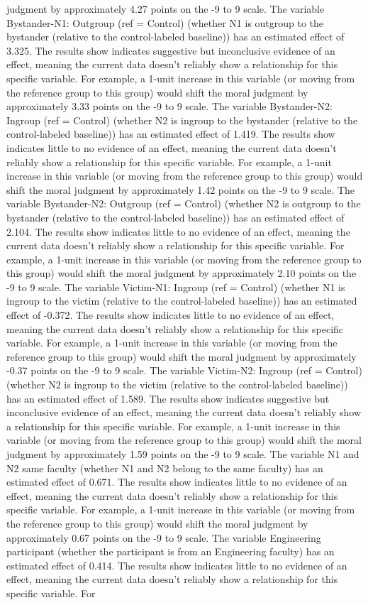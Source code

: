 \documentclass[11pt]{article}
\begin{document}
judgment by approximately 4.27 points on the -9 to 9 scale. The variable Bystander-N1: Outgroup (ref = Control) (whether N1 is outgroup to the bystander (relative to the control-labeled baseline)) has an estimated effect of 3.325. The results show indicates suggestive but inconclusive evidence of an effect, meaning the current data doesn't reliably show a relationship for this specific variable. For example, a 1-unit increase in this variable (or moving from the reference group to this group) would shift the moral judgment by approximately 3.33 points on the -9 to 9 scale. The variable Bystander-N2: Ingroup (ref = Control) (whether N2 is ingroup to the bystander (relative to the control-labeled baseline)) has an estimated effect of 1.419. The results show indicates little to no evidence of an effect, meaning the current data doesn't reliably show a relationship for this specific variable. For example, a 1-unit increase in this variable (or moving from the reference group to this group) would shift the moral judgment by approximately 1.42 points on the -9 to 9 scale. The variable Bystander-N2: Outgroup (ref = Control) (whether N2 is outgroup to the bystander (relative to the control-labeled baseline)) has an estimated effect of 2.104. The results show indicates little to no evidence of an effect, meaning the current data doesn't reliably show a relationship for this specific variable. For example, a 1-unit increase in this variable (or moving from the reference group to this group) would shift the moral judgment by approximately 2.10 points on the -9 to 9 scale. The variable Victim-N1: Ingroup (ref = Control) (whether N1 is ingroup to the victim (relative to the control-labeled baseline)) has an estimated effect of -0.372. The results show indicates little to no evidence of an effect, meaning the current data doesn't reliably show a relationship for this specific variable. For example, a 1-unit increase in this variable (or moving from the reference group to this group) would shift the moral judgment by approximately -0.37 points on the -9 to 9 scale. The variable Victim-N2: Ingroup (ref = Control) (whether N2 is ingroup to the victim (relative to the control-labeled baseline)) has an estimated effect of 1.589. The results show indicates suggestive but inconclusive evidence of an effect, meaning the current data doesn't reliably show a relationship for this specific variable. For example, a 1-unit increase in this variable (or moving from the reference group to this group) would shift the moral judgment by approximately 1.59 points on the -9 to 9 scale. The variable N1 and N2 same faculty (whether N1 and N2 belong to the same faculty) has an estimated effect of 0.671. The results show indicates little to no evidence of an effect, meaning the current data doesn't reliably show a relationship for this specific variable. For example, a 1-unit increase in this variable (or moving from the reference group to this group) would shift the moral judgment by approximately 0.67 points on the -9 to 9 scale. The variable Engineering participant (whether the participant is from an Engineering faculty) has an estimated effect of 0.414. The results show indicates little to no evidence of an effect, meaning the current data doesn't reliably show a relationship for this specific variable. For 
\end{document}
